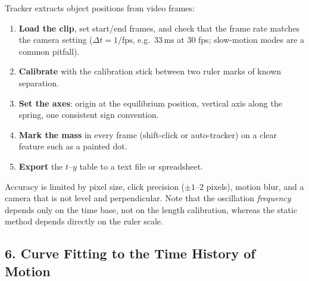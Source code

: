 \documentclass[12pt,a4paper]{article}
\begin{document}
Tracker extracts object positions from video frames:
\begin{enumerate}
    \item \textbf{Load the clip}, set start/end frames, and check that the frame rate matches the camera setting ($\Delta t=1/\text{fps}$, e.g.\ $33\,\text{ms}$ at 30 fps; slow-motion modes are a common pitfall).
    \item \textbf{Calibrate} with the calibration stick between two ruler marks of known separation.
    \item \textbf{Set the axes}: origin at the equilibrium position, vertical axis along the spring, one consistent sign convention.
    \item \textbf{Mark the mass} in every frame (shift-click or auto-tracker) on a clear feature such as a painted dot.
    \item \textbf{Export} the $t$--$y$ table to a text file or spreadsheet.
\end{enumerate}
Accuracy is limited by pixel size, click precision ($\pm1$--$2$ pixels), motion blur, and a camera that is not level and perpendicular. Note that the oscillation \emph{frequency} depends only on the time base, not on the length calibration, whereas the static method depends directly on the ruler scale.

\subsection*{6. Curve Fitting to the Time History of Motion}
\end{document}
